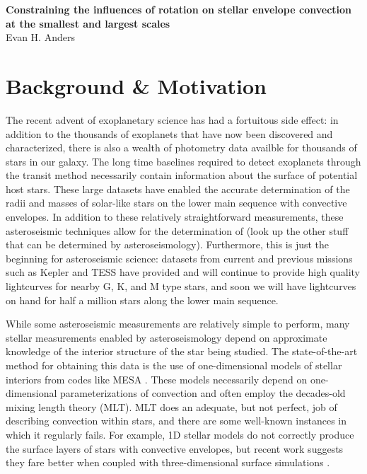 \documentclass[aasms,12pt]{article}
\begin{document}
\begin{center}
   \large\textbf{Constraining the influences of rotation on stellar envelope convection at the smallest and largest scales}\\
   \vspace{0.2cm}
   \large{Evan H. Anders}\\
   \vspace{0.2cm}
\end{center}

\vspace{-0.6cm}

\section{Background \& Motivation}
The recent advent of exoplanetary science has had a fortuitous side effect: in addition to the thousands of exoplanets that have now been discovered and characterized, there is also a wealth of photometry data availble for thousands of stars in our galaxy.
The long time baselines required to detect exoplanets through the transit method necessarily contain information about the surface of potential host stars.
These large datasets have enabled the accurate determination of the radii and masses of solar-like stars on the lower main sequence with convective envelopes.
In addition to these relatively straightforward measurements, these asteroseismic techniques allow for the determination of (look up the other stuff that can be determined by asteroseismology).
Furthermore, this is just the beginning for asteroseismic science: datasets from current and previous missions such as Kepler and TESS have provided and will continue to provide high quality lightcurves for nearby G, K, and M type stars, and soon we will have lightcurves on hand for half a million stars along the lower main sequence.

While some asteroseismic measurements are relatively simple to perform, many stellar measurements enabled by asteroseismology depend on approximate knowledge of the interior structure of the star being studied.
The state-of-the-art method for obtaining this data is the use of one-dimensional models of stellar interiors from codes like MESA \citep{paxton&all2011}.
These models necessarily depend on one-dimensional parameterizations of convection and often employ the decades-old mixing length theory (MLT).
MLT does an adequate, but not perfect, job of describing convection within stars, and there are some well-known instances in which it regularly fails.
For example, 1D stellar models do not correctly produce the surface layers of stars with convective envelopes, but recent work suggests they fare better when coupled with three-dimensional surface simulations \citep{jorgensen&weiss2019}.
\end{document}
